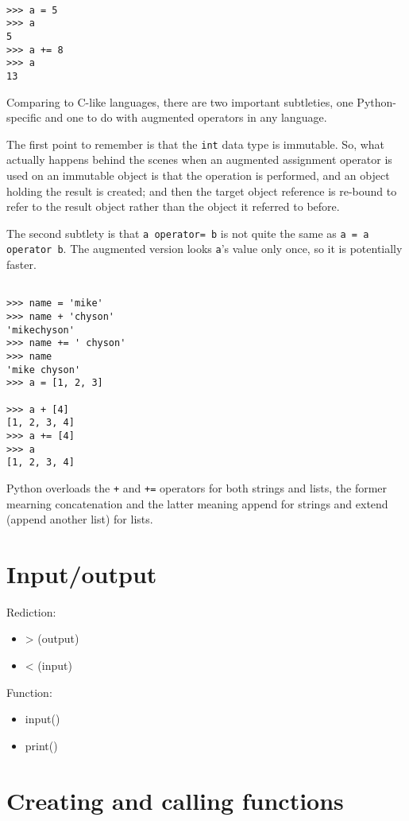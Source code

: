 \begin{lstlisting}

>>> a = 5
>>> a
5
>>> a += 8
>>> a
13
\end{lstlisting}


Comparing to C-like languages, there are two important subtleties, one Python-specific and one to do with augmented operators in any language.


The first point to remember is that the \verb|int| data type is immutable.
So, what actually happens behind the scenes when an augmented assignment operator is used on an immutable object is that the operation is performed, and an object holding the result is created; and then the target object reference is re-bound to refer to the result object rather than the object it referred to before.


The second subtlety is that \verb|a operator= b| is not quite the same  as  \verb|a = a operator b|.
The augmented version looks \verb|a|'s value only once, so it is potentially faster.


\begin{lstlisting}

>>> name = 'mike'
>>> name + 'chyson'
'mikechyson'
>>> name += ' chyson'
>>> name
'mike chyson'
>>> a = [1, 2, 3]

>>> a + [4]
[1, 2, 3, 4]
>>> a += [4]
>>> a
[1, 2, 3, 4]
\end{lstlisting}


Python overloads the \verb|+| and \verb|+=| operators for both strings and lists, the former mearning concatenation and the latter meaning append for strings and extend (append another list) for lists.


\section{Input/output}

Rediction:
\begin{itemize}
\item > (output)
\item < (input)
\end{itemize}


Function:
\begin{itemize}
\item input()
\item print()
\end{itemize}



\section{Creating and calling functions}

